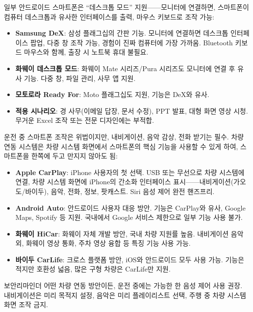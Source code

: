 
일부 안드로이드 스마트폰은 “데스크톱 모드” 지원——모니터에 연결하면, 스마트폰이 컴퓨터 데스크톱과 유사한 인터페이스를 출력, 마우스 키보드로 조작 가능:

\begin{itemize}
  \item \textbf{Samsung DeX}: 삼성 플래그십의 간판 기능. 모니터에 연결하면 데스크톱 인터페이스 팝업, 다중 창 조작 가능, 경험이 진짜 컴퓨터에 가장 가까움. Bluetooth 키보드 마우스와 함께, 출장 시 노트북 휴대 불필요.
  \item \textbf{화웨이 데스크톱 모드}: 화웨이 Mate 시리즈/Pura 시리즈도 모니터에 연결 후 유사 기능. 다중 창, 파일 관리, 사무 앱 지원.
  \item \textbf{모토로라 Ready For}: Moto 플래그십도 지원, 기능은 DeX와 유사.
  \item \textbf{적용 시나리오}: 경 사무(이메일 답장, 문서 수정), PPT 발표, 대형 화면 영상 시청. 무거운 Excel 조작 또는 전문 디자인에는 부적합.
\end{itemize}


운전 중 스마트폰 조작은 위법이지만, 내비게이션, 음악 감상, 전화 받기는 필수. 차량 연동 시스템은 차량 시스템 화면에서 스마트폰의 핵심 기능을 사용할 수 있게 하여, 스마트폰을 한쪽에 두고 만지지 않아도 됨:

\begin{itemize}
  \item \textbf{Apple CarPlay}: iPhone 사용자의 첫 선택. USB 또는 무선으로 차량 시스템에 연결, 차량 시스템 화면에 iPhone의 간소화 인터페이스 표시——내비게이션(가오도/바이두), 음악, 전화, 정보, 팟캐스트. Siri 음성 제어 완전 핸즈프리.
  \item \textbf{Android Auto}: 안드로이드 사용자 대응 방안. 기능은 CarPlay와 유사, Google Maps, Spotify 등 지원. 국내에서 Google 서비스 제한으로 일부 기능 사용 불가.
  \item \textbf{화웨이 HiCar}: 화웨이 자체 개발 방안, 국내 차량 지원률 높음. 내비게이션 음악 외, 화웨이 영상 통화, 주차 영상 융합 등 특징 기능 사용 가능.
  \item \textbf{바이두 CarLife}: 크로스 플랫폼 방안, iOS와 안드로이드 모두 사용 가능. 기능은 적지만 호환성 넓음, 많은 구형 차량은 CarLife만 지원.
\end{itemize}

\begin{tcbwarn}{보안리마인더}
어떤 차량 연동 방안이든, 운전 중에는 가능한 한 음성 제어 사용 권장. 내비게이션은 미리 목적지 설정, 음악은 미리 플레이리스트 선택, 주행 중 차량 시스템 화면 조작 금지.

\end{tcbwarn}

